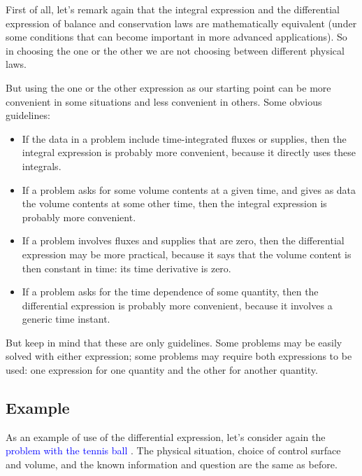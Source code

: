 \documentclass[a4paper,12pt,%
onecolumn,oneside,%
british%
]{memoir}
\renewcommand*{\|}[1][]{\nonscript\:#1\vert\nonscript\:\mathopen{}}
\newcommand*{\sect}{\S}%
\renewcommand*{\autoref}[3][\sect\,\ref]{\textcolor{blue}{#3}
\raisebox{0.6ex}{\color{blue}\miniscule%
\faIcon{angle-right}%
\;#1{#2}\;p.\,\pageref{#2}}}
\begin{document}
First of all, let's remark again that the integral expression and the differential expression of balance and conservation laws are mathematically equivalent (under some conditions that can become important in more advanced applications). So in choosing the one or the other we are not choosing between different physical laws.

But using the one or the other expression as our starting point can be more convenient in some situations and less convenient in others. Some obvious guidelines:
\begin{itemize}
\item If the data in a problem include time-integrated fluxes or supplies, then the integral expression is probably more convenient, because it directly uses these integrals.
\item If a problem asks for some volume contents at a given time, and gives as data the volume contents at some other time, then the integral expression is probably more convenient.

  \smallskip

\item If a problem involves fluxes and supplies that are zero, then the differential expression may be more practical, because it says that the volume content is then constant in time: its time derivative is zero.
\item If a problem asks for the time dependence of some quantity, then the differential expression is probably more convenient, because it involves a generic time instant.
\end{itemize}
But keep in mind that these are only guidelines. Some problems may be easily solved with either expression; some problems may require both expressions to be used: one expression for one quantity and the other for another quantity.

\subsection{Example}
\label{sec:example_diff}

As an example of use of the differential expression, let's consider again the \autoref{sec:example_conservation_moving}{problem with the tennis ball}. The physical situation, choice of control surface and volume, and the known information and question are the same as before.
\end{document}
